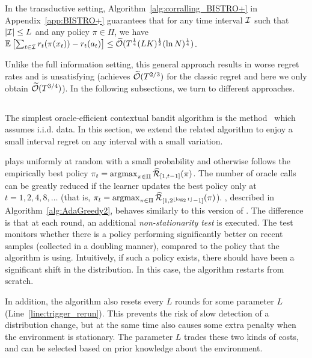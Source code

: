 \begin{theorem}\label{thm:corralling_BISTRO+}
In the transductive setting, Algorithm~\ref{alg:corralling_BISTRO+} in Appendix~\ref{app:BISTRO+} guarantees
that for any time interval ${\mathcal{I}}$ such that $|{\mathcal{I}}| \leq L$ and any policy $\pi \in \Pi$, we have $\mathbb{E}\left[
  \sum_{t\in{\mathcal{I}}}r_t(\pi(x_t)) - r_t(a_t) \right] \leq
\widetilde{\mathcal{O}}(T^{\frac{1}{4}}(LK)^{\frac{1}{2}}(\ln N)^{\frac{1}{4}})$.
\end{theorem}

Unlike the full information setting, this general approach results in worse regret rates and is unsatisfying
(\bistro achieves $\widetilde{\mathcal{O}}(T^{2/3})$ for the classic regret and here we only obtain $\widetilde{\mathcal{O}}(T^{3/4})$).
In the following subsections, we turn to different approaches. 

\subsection{\AdaEG}

The simplest oracle-efficient contextual bandit algorithm is the \EG
method~\citep{LangfordZh08} which assumes i.i.d. data. 
In this section, we extend the related \EPG
algorithm to enjoy a small interval regret on any interval with a
small variation.

\EPG plays uniformly at random with a small probability and
otherwise follows the empirically best policy $\pi_t=\operatorname*{argmax}_{\pi\in\Pi}
\widehat{\cal{R}}_{[1,t-1]}(\pi)$. The number of oracle calls can be greatly reduced if the learner updates the best policy only at $t=1, 2, 4, 8, \ldots$ (that is, $\pi_t=\operatorname*{argmax}_{\pi\in\Pi}
\widehat{\cal{R}}_{[1,2^{\lfloor\log_2{t}\rfloor}-1]}(\pi)$). 
\AdaEG, described in Algorithm~\ref{alg:AdaGreedy2}, behaves similarly to this version of \EPG. 
The difference is that at each round, an additional \textit{non-stationarity test} is executed. 
The test monitors whether there is a policy performing significantly better on recent samples (collected in a doubling manner), 
compared to the policy that the algorithm is using. 
Intuitively, if such a policy exists, there should have been a significant shift in the distribution.
In this case, the algorithm restarts from scratch. 

In addition, the algorithm also resets every $L$ rounds for some parameter $L$ (Line~\ref*{line:trigger_rerun}). 
This prevents the risk of slow detection of a distribution change, but at the same time also causes some extra penalty when the environment is stationary.
The parameter $L$ trades these two kinds of costs, and can be selected based on prior knowledge about the environment. 

